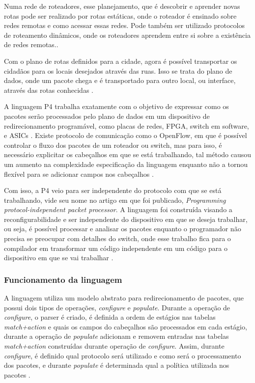 \documentclass[12pt,
openright, 
oneside,
a4paper,
brazil]{facom-ufu-abntex2}
\theoremstyle{definition}
\begin{document}
Numa rede de roteadores, esse planejamento, que é descobrir e aprender novas rotas 
pode ser realizado por rotas estáticas, onde o roteador é ensinado sobre redes remotas
e como acessar essas redes. Pode também ser utilizado protocolos de roteamento dinâmicos,
onde os roteadores aprendem entre si sobre a existência de redes remotas.\citep{dataVsControl}.

Com o plano de rotas definidos para a cidade, agora é possível transportar os cidadãos
para os locais desejados através das ruas. Isso se trata do plano de dados, onde 
um pacote chega e é transportado para outro local, ou interface, através das rotas 
conhecidas \citep{dataVsControl}.

A linguagem P4 trabalha exatamente com o objetivo de expressar como os pacotes serão 
processados pelo plano de dados em um dispositivo de redirecionamento programável, 
como placas de redes, FPGA, switch em software, e ASICs \citep{paxos16spec}. Existe 
protocolo de comunicação como o OpenFlow, em que é possível controlar o fluxo dos 
pacotes de um roteador ou switch, mas para isso, é necessário explicitar os 
cabeçalhos em que se está trabalhando, tal método causou um aumento na complexidade 
especificação da linguagem enquanto não a tornou flexível para se adicionar campos 
nos cabeçalhos \citep{bosshart2014p4}.

Com isso, a P4 veio para ser independente do protocolo com que se está trabalhando,
vide seu nome no artigo em que foi publicado, 
\textit{Programming protocol-independent packet processor}. A linguagem foi 
construída visando a reconfigurabilidade e ser independente do dispositivo em que se 
deseja trabalhar, ou seja, é possível processar e analisar os pacotes enquanto o programador
não precisa se preocupar com detalhes do switch, onde esse trabalho fica para o compilador 
em transformar um código independente em um código para o dispositivo em que se vai 
trabalhar \citep{bosshart2014p4}.

\subsubsection{Funcionamento da linguagem}

A linguagem utiliza um modelo abstrato para redirecionamento de pacotes, que possui
dois tipos de operações, \textit{configure} e \textit{populate}. Durante a operação
de \textit{configure}, o parser é criado, é definida a ordem de estágios nas tabelas
\textit{match+action} e quais os campos do cabeçalhos são processados em cada estágio,
durante a operação de \textit{populate} adicionam e removem entradas nas tabelas
\textit{match+action} construídas durante operação de \textit{configure}. Assim,
durante \textit{configure}, é definido qual protocolo será utilizado e como será
o processamento dos pacotes, e durante \textit{populate} é determinada qual a 
política utilizada nos pacotes \citep{bosshart2014p4}.
\end{document}
